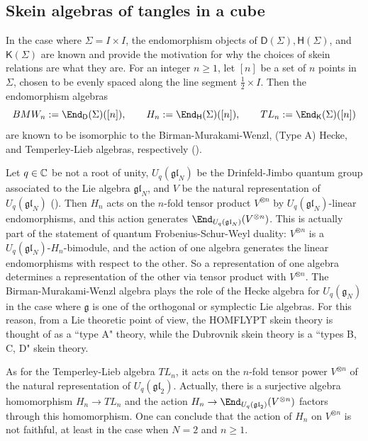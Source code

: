 \subsection{Skein algebras of tangles in a cube}

In the case where $\Sigma = I \times I$, the endomorphism objects of $\mathsf{D}(\Sigma), \mathsf{H}(\Sigma)$, and $\mathsf{K}(\Sigma)$ are known and provide the motivation for why the choices of skein relations are what they are. For an integer $n \geq 1$, let $[n]$ be a set of $n$ points in $\Sigma$, chosen to be evenly spaced along the line segment $\frac{1}{2} \times I$. Then the endomorphism algebras 
\[
BMW_n := \End_\mathsf{D}(\Sigma)([n]), \qquad H_n := \End_\mathsf{H}(\Sigma)([n]), \qquad TL_n := \End_\mathsf{K}(\Sigma)([n])
\]
are known to be isomorphic to the Birman-Murakami-Wenzl, (Type A) Hecke, and Temperley-Lieb algebras, respectively (). 

Let $q \in \mathbb{C}$ be not a root of unity, $U_q(\mathfrak{gl}_N)$ be the Drinfeld-Jimbo quantum group associated to the Lie algebra $\mathfrak{gl}_N$, and $V$ be the natural representation of $U_q(\mathfrak{gl}_N)$ (). Then $H_n$ acts on the $n$-fold tensor product $V^{\otimes n}$ by $U_q(\mathfrak{gl}_N)$-linear endomorphisms, and this action generates $\End_{U_q(\mathfrak{gl}_N)}(V^{\otimes n})$. This is actually part of the statement of quantum Frobenius-Schur-Weyl duality: $V^{\otimes n}$ is a $U_q(\mathfrak{gl}_N)$-$H_n$-bimodule, and the action of one algebra generates the linear endomorphisms with respect to the other. So a representation of one algebra determines a representation of the other via tensor product with $V^{\otimes n}$. The Birman-Murakami-Wenzl algebra plays the role of the Hecke algebra for $U_q(\mathfrak{g}_N)$ in the case where $\mathfrak{g}$ is one of the orthogonal or symplectic Lie algebras. For this reason, from a Lie theoretic point of view, the HOMFLYPT skein theory is thought of as a ``type A" theory, while the Dubrovnik skein theory is a ``types B, C, D" skein theory.

As for the Temperley-Lieb algebra $TL_n$, it acts on the $n$-fold tensor power $V^{\otimes n}$ of the natural representation of $U_q(\mathfrak{gl}_2)$. Actually, there is a surjective algebra homomorphism $H_n \to TL_n$ and the action $H_n \to \End_{U_q(\mathfrak{gl}_2)}(V^{\otimes n})$ factors through this homomorphism. One can conclude that the action of $H_n$ on $V^{\otimes n}$ is not faithful, at least in the case when $N=2$ and $n \geq 1$.


